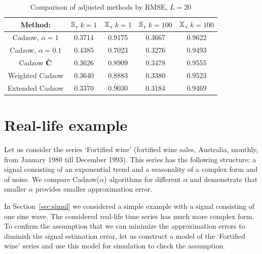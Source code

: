 \documentclass[sii]{ipart}
\begin{document}
\begin{table}
	\begin{center}
		\caption{Comparison of adjusted methods by RMSE, $L = 20$}\label{fintable_improved}
		\begin{tabular*}{\textwidth}{@{\extracolsep{\fill}}ccccc}
			\hline
			Method: & $\mathbb{S}$, $k = 1$ & $\mathbb{X}$, $k = 1$ & $\mathbb{S}$, $k = 100$ & $\mathbb{X}$, $k = 100$  \\
			\hline
			Cadzow, $\alpha = 1$ & 0.3714 & 0.9175 & 0.3667 & 0.9622 \\
			\hline
			Cadzow, $\alpha = 0.1$ & 0.4385 & 0.7023 & 0.3276 & 0.9493 \\
			\hline
			Cadzow $\hat{\mathbf{C}}$ & 0.3626 & 0.8909 & 0.3478 & 0.9555 \\
			\hline
			Weighted Cadzow & 0.3640 & 0.8883 & 0.3380 & 0.9523 \\
			\hline
			Extended Cadzow & 0.3370 & 0.9030 & 0.3184 & 0.9469 \\
			\hline
		\end{tabular*}
	\end{center}
\end{table}

\section{Real-life example}
\label{sec:appB}
Let us consider the series `Fortified wine' (fortified wine sales, Australia, monthly, from January 1980 till December 1993). This series has the following structure: a signal consisting of an exponential trend and a seasonality of a complex form and of noise.
We compare Cadzow($\alpha$) algorithms for different $\alpha$ and demonstrate that smaller $\alpha$ provides
smaller approximation error.

In Section~\ref{sec:simul} we considered a simple example with a signal consisting of one sine wave.
The considered real-life time series has much more complex form. To confirm the assumption that we can minimize
the approximation errors to diminish the signal estimation error,
let us construct a model of the `Fortified wine' series and use this model for simulation to
check the assumption.
\end{document}
